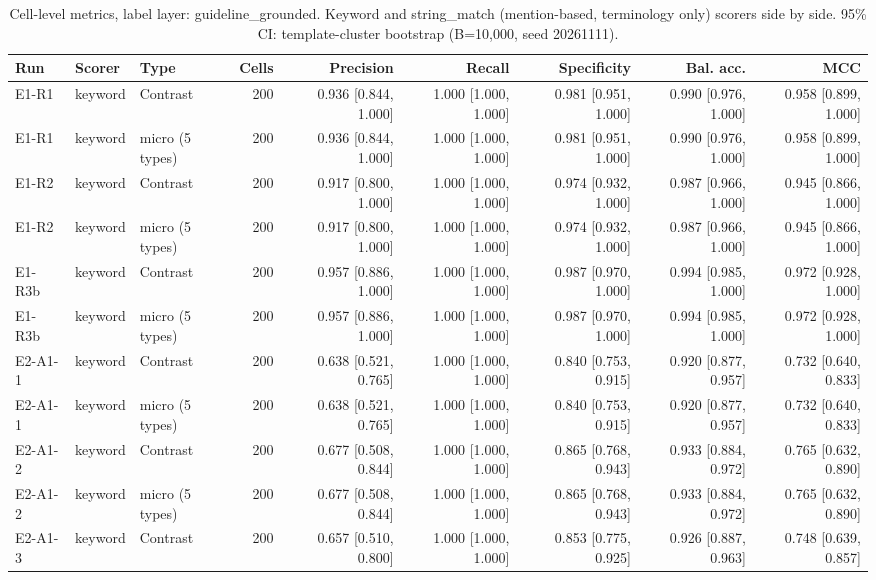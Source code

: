 \begin{table}[t]
\centering
\small
\caption{Cell-level metrics, label layer: guideline\_grounded. Keyword and string\_match (mention-based, terminology only) scorers side by side. 95\% CI: template-cluster bootstrap (B=10,000, seed 20261111).}
\label{tab:e7-cells-guideline_grounded}
\begin{tabular}{lllrrrrrr}
\toprule
Run & Scorer & Type & Cells & Precision & Recall & Specificity & Bal. acc. & MCC \\
\midrule
E1-R1 & keyword & Contrast & 200 & 0.936 [0.844, 1.000] & 1.000 [1.000, 1.000] & 0.981 [0.951, 1.000] & 0.990 [0.976, 1.000] & 0.958 [0.899, 1.000] \\
E1-R1 & keyword & micro (5 types) & 200 & 0.936 [0.844, 1.000] & 1.000 [1.000, 1.000] & 0.981 [0.951, 1.000] & 0.990 [0.976, 1.000] & 0.958 [0.899, 1.000] \\
E1-R2 & keyword & Contrast & 200 & 0.917 [0.800, 1.000] & 1.000 [1.000, 1.000] & 0.974 [0.932, 1.000] & 0.987 [0.966, 1.000] & 0.945 [0.866, 1.000] \\
E1-R2 & keyword & micro (5 types) & 200 & 0.917 [0.800, 1.000] & 1.000 [1.000, 1.000] & 0.974 [0.932, 1.000] & 0.987 [0.966, 1.000] & 0.945 [0.866, 1.000] \\
E1-R3b & keyword & Contrast & 200 & 0.957 [0.886, 1.000] & 1.000 [1.000, 1.000] & 0.987 [0.970, 1.000] & 0.994 [0.985, 1.000] & 0.972 [0.928, 1.000] \\
E1-R3b & keyword & micro (5 types) & 200 & 0.957 [0.886, 1.000] & 1.000 [1.000, 1.000] & 0.987 [0.970, 1.000] & 0.994 [0.985, 1.000] & 0.972 [0.928, 1.000] \\
E2-A1-1 & keyword & Contrast & 200 & 0.638 [0.521, 0.765] & 1.000 [1.000, 1.000] & 0.840 [0.753, 0.915] & 0.920 [0.877, 0.957] & 0.732 [0.640, 0.833] \\
E2-A1-1 & keyword & micro (5 types) & 200 & 0.638 [0.521, 0.765] & 1.000 [1.000, 1.000] & 0.840 [0.753, 0.915] & 0.920 [0.877, 0.957] & 0.732 [0.640, 0.833] \\
E2-A1-2 & keyword & Contrast & 200 & 0.677 [0.508, 0.844] & 1.000 [1.000, 1.000] & 0.865 [0.768, 0.943] & 0.933 [0.884, 0.972] & 0.765 [0.632, 0.890] \\
E2-A1-2 & keyword & micro (5 types) & 200 & 0.677 [0.508, 0.844] & 1.000 [1.000, 1.000] & 0.865 [0.768, 0.943] & 0.933 [0.884, 0.972] & 0.765 [0.632, 0.890] \\
E2-A1-3 & keyword & Contrast & 200 & 0.657 [0.510, 0.800] & 1.000 [1.000, 1.000] & 0.853 [0.775, 0.925] & 0.926 [0.887, 0.963] & 0.748 [0.639, 0.857] \\

\end{tabular}
\end{table}
